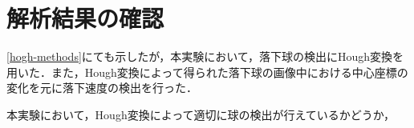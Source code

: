 \section{解析結果の確認}

\ref{hogh-methods}にても示したが，本実験において，落下球の検出にHough変換を用いた．また，Hough変換によって得られた落下球の画像中における中心座標の変化を元に落下速度の検出を行った．

本実験において，Hough変換によって適切に球の検出が行えているかどうか，

